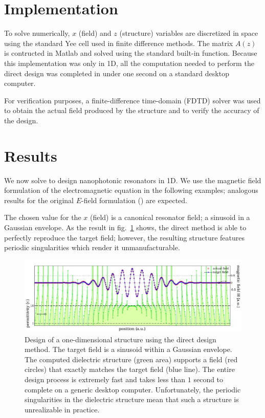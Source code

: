 \section{Implementation}
To solve  numerically, $x$ (field) and $z$ (structure) variables
    are discretized in space using the standard Yee cell 
    used in finite difference methods\cite{Yee66}. 
The matrix $A(z)$ is contructed in Matlab and solved using 
    the standard built-in function.
Because this implementation was only in 1D,
    all the computation needed to perform the direct design
    was completed in under one second 
    on a standard desktop computer.

For verification purposes, 
    a finite-difference time-domain (FDTD) solver was used 
    to obtain the actual field produced by the structure and 
    to verify the accuracy of the design.  

\section{Results}
We now solve  to design nanophotonic resonators in 1D\cite{Lu10}.
We use the magnetic field formulation of the electromagnetic equation
    in the following examples;
    analogous results for the original $E$-field formulation ()
    are expected.

The chosen value for the $x$ (field) is a canonical resonator field; 
    a sinusoid in a Gaussian envelope.
As the result in fig.~\ref{p1:direct} shows,
    the direct method is able to perfectly reproduce the target field;
    however, the resulting structure features
    periodic singularities which render it unmanufacturable.

\begin{figure}[htbp]\centering
\includegraphics[width=\textwidth]{p1/leastsquares}
\caption{Design of a one-dimensional structure using the direct design method.
    The target field is a sinusoid within a Gaussian envelope. 
    The computed dielectric structure (green area) supports 
        a field (red circles) that exactly matches the target field (blue line). 
    The entire design process is extremely fast and takes less than 
        $1$ second to complete on a generic desktop computer.
    Unfortunately, the periodic singularities in the dielectric structure 
        mean that such a structure is unrealizable in practice.}
\label{p1:direct}\end{figure}

